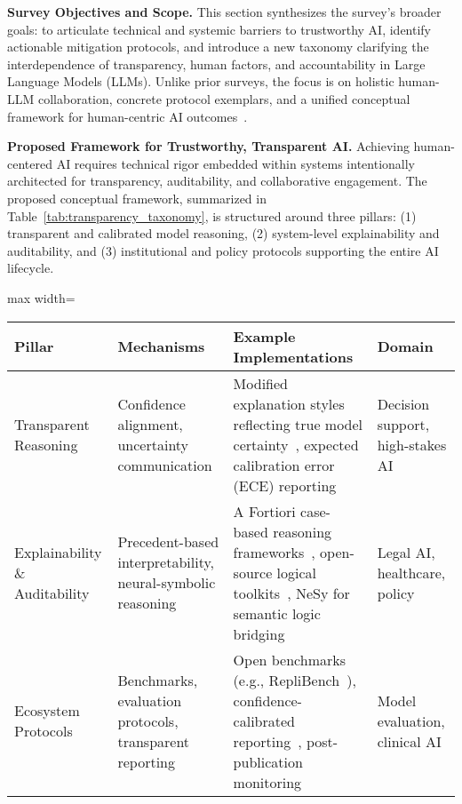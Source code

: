 \documentclass[sigconf]{acmart}
\begin{document}
\textbf{Survey Objectives and Scope.} This section synthesizes the survey’s broader goals: to articulate technical and systemic barriers to trustworthy AI, identify actionable mitigation protocols, and introduce a new taxonomy clarifying the interdependence of transparency, human factors, and accountability in Large Language Models (LLMs). Unlike prior surveys, the focus is on holistic human-LLM collaboration, concrete protocol exemplars, and a unified conceptual framework for human-centric AI outcomes~\cite{ref52,ref55}. 

\textbf{Proposed Framework for Trustworthy, Transparent AI.} Achieving human-centered AI requires technical rigor embedded within systems intentionally architected for transparency, auditability, and collaborative engagement. The proposed conceptual framework, summarized in Table~\ref{tab:transparency_taxonomy}, is structured around three pillars: (1) transparent and calibrated model reasoning, (2) system-level explainability and auditability, and (3) institutional and policy protocols supporting the entire AI lifecycle.

\begin{table*}[htbp]
\centering
\caption{Taxonomy of Human-Centric Transparency and Accountability in LLM Systems}
\label{tab:transparency_taxonomy}
\begin{adjustbox}{max width=\textwidth}
\begin{tabular}{@{}llll@{}}
\toprule
Pillar & Mechanisms & Example Implementations & Domain \\ 
\midrule
Transparent Reasoning & Confidence alignment, uncertainty communication & Modified explanation styles reflecting true model certainty~\cite{ref35}, expected calibration error (ECE) reporting~\cite{ref35} & Decision support, high-stakes AI \\
Explainability \& Auditability & Precedent-based interpretability, neural-symbolic reasoning & A Fortiori case-based reasoning frameworks~\cite{ref46}, open-source logical toolkits~\cite{ref46}, NeSy for semantic logic bridging~\cite{ref44,ref52} & Legal AI, healthcare, policy \\
Ecosystem Protocols & Benchmarks, evaluation protocols, transparent reporting & Open benchmarks (e.g., RepliBench~\cite{ref23}), confidence-calibrated reporting~\cite{ref42}, post-publication monitoring~\cite{ref40,ref53} & Model evaluation, clinical AI \\
\bottomrule
\end{tabular}
\end{adjustbox}
\end{table*}
\end{document}
